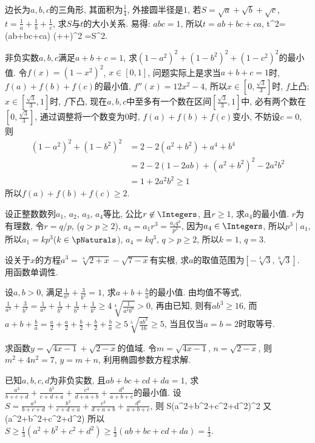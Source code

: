 \bq{}{}
边长为$a,b,c$的三角形, 其面积为$\frac{1}{4}$, 外接圆半径是$1$, 
若$S=\sqrt{a}+\sqrt{b}+\sqrt{c}$, $t=\frac{1}{a}+\frac{1}{b}+\frac{1}{c}$, 
求$S$与$t$的大小关系.
\eq
\ba
易得: $abc=1$, 所以$t=ab+bc+ca$, 
\bee
t^{2}=(ab+bc+ca)
  \ge(++)^{2}
  =S^{2}.
\eee
\ea

\bq{}{}
非负实数$a,b,c$满足$a+b+c=1$, 求$(1-a^{2})^{2}+(1-b^{2})^{2}+(1-c^{2})^{2}$的最小值.
\eq
\ba
令$f(x)=(1-x^{2})^{2}$, $x\in[0,1]$, 问题实际上是求当$a+b+c=1$时, $f(a)+f(b)+f(c)$的最小值,
$f''(x)=12x^{2}-4$, 所以$x\in\left[0,\frac{\sqrt{3}}{3}\right]$时,
$f$上凸; $x\in\left[\frac{\sqrt{3}}{3},1\right]$时, $f$下凸, 
现在$a,b,c$中至多有一个数在区间$\left[\frac{\sqrt{3}}{3},1\right]$中,
必有两个数在$\left[0,\frac{\sqrt{3}}{3}\right]$, 通过调整将一个数变为$0$时, $f(a)+f(b)+f(c)$变小,
不妨设$c=0$, 则
\begin{align*}
(1-a^{2})^{2}+(1-b^{2})^{2} 
  & =2-2(a^{2}+b^{2})+a^{4}+b^{4}\\
  & =2-2(1-2ab)+(a^{2}+b^{2})^{2}-2a^{2}b^{2}\\
  & =1+2a^{2}b^{2}\ge1
\end{align*}
所以$f(a)+f(b)+f(c)\ge2$.
\ea

\bq{}{}
设正整数数列$a_{1}$, $a_{2}$, $a_{3}$, $a_{4}$等比, 公比$r\not\in\Integers$,
且$r\ge1$, 求$a_{4}$的最小值.
\eq
\ba
$r$为有理数, 令$r=q/p$, ($q>p\ge2$), $a_{4}=a_{1}r^{3}=\frac{a_{1}q^{3}}{p^{3}}$,
因为$a_{4}\in\Integers$, 所以$p^{3}\mid a_{1}$, 所以$a_{1}=kp^{3}$($k\in\pNaturals$),
$a_{4}=kq^{3}$, $q>p\ge2$, 所以$k=1$, $q=3$.
\ea

\bq{}{}
设关于$x$的方程$a^{3}=\sqrt[4]{2+x}-\sqrt{7-x}$有实根, 求$a$的取值范围为$[-\sqrt[3]{3},\sqrt[6]{3}]$.
\eq
\ba
用函数单调性.
\ea

\bq{}{}
设$a,b>0$, 满足$\frac{1}{a^{2}}+\frac{3}{b^{2}}=1$, 求$a+b+\frac{b}{a}$的最小值.
\eq
\ba
由均值不等式, $\frac{1}{a^{2}}+\frac{3}{b^{2}}=\frac{1}{a^{2}}+\frac{1}{b^{2}}+\frac{1}{b^{2}}+\frac{1}{b^{2}}\ge4\sqrt[4]{\frac{1}{a^{2}b^{6}}}>0$,
再由已知, 则有$ab^{3}\ge16$, 而$a+b+\frac{b}{a}=\frac{a}{2}+\frac{a}{2}+\frac{b}{2}+\frac{b}{2}+\frac{b}{a}\ge5\sqrt[5]{\frac{ab^{3}}{16}}\ge5$,
当且仅当$a=b=2$时取等号.
\ea

\bq{}{}
求函数$y=\sqrt{4x-1}+\sqrt{2-x}$的值域.
\eq
\ba
令$m=\sqrt{4x-1}$, $n=\sqrt{2-x}$, 则$m^{2}+4n^{2}=7$, $y=m+n$,
利用椭圆参数方程求解.
\ea

\bq{}{}
已知$a,b,c,d$为非负实数, 且$ab+bc+cd+da=1$, 求$\frac{a^{3}}{b+c+d}+\frac{b^{3}}{c+d+a}+\frac{c^{3}}{d+a+b}+\frac{d^{3}}{a+b+c}$的最小值.
\eq
\ba
设$S=\frac{a^{3}}{b+c+d}+\frac{b^{3}}{c+d+a}+\frac{c^{3}}{d+a+b}+\frac{d^{3}}{a+b+c}$,
则
\bee
[a(b+c+d)+b(c+d+a)+c(d+a+b)+d(a+b+c)]S\ge(a^{2}+b^{2}+c^{2}+d^{2})^{2}
\eee
又
\bee
[a(b+c+d)+b(c+d+a)+c(d+a+b)+d(a+b+c)](a^{2}+b^{2}+c^{2}+d^{2})
\eee
所以$S\ge\frac{1}{3}(a^{2}+b^{2}+c^{2}+d^{2})\ge\frac{1}{3}(ab+bc+cd+da)=\frac{1}{3}$.
\ea

